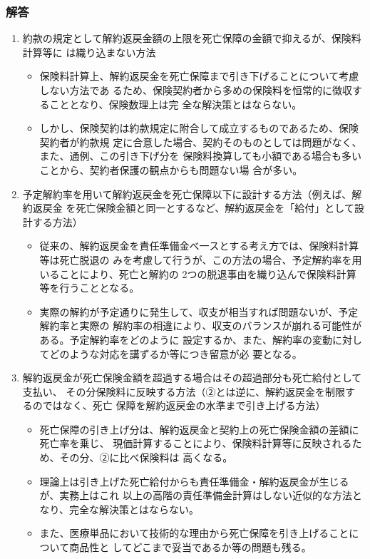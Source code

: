 \documentclass[report,gutter=10mm,fore-edge=10mm,uplatex,dvipdfmx]{jlreq}
\begin{document}
\subsubsection{解答}
\begin{enumerate}
 \item 約款の規定として解約返戻金額の上限を死亡保障の金額で抑えるが、保険料計算等に
は織り込まない方法
\begin{itemize}
 \item 保険料計算上、解約返戻金を死亡保障まで引き下げることについて考慮しない方法であ
るため、保険契約者から多めの保険料を恒常的に徴収することとなり、保険数理上は完
全な解決策とはならない。
 \item しかし、保険契約は約款規定に附合して成立するものであるため、保険契約者が約款規
定に合意した場合、契約そのものとしては問題がなく、また、通例、この引き下げ分を
保険料換算しても小額である場合も多いことから、契約者保護の観点からも問題ない場
合が多い。
\end{itemize}
 \item 予定解約率を用いて解約返戻金を死亡保障以下に設計する方法（例えば、解約返戻金
を死亡保険金額と同一とするなど、解約返戻金を「給付」として設計する方法）
\begin{itemize}
 \item 従来の、解約返戻金を責任準備金べ一スとする考え方では、保険料計算等は死亡脱退の
みを考慮して行うが、この方法の場合、予定解約率を用いることにより、死亡と解約の
2つの脱退事由を織り込んで保険料計算等を行うこととなる。
 \item 実際の解約が予定通りに発生して、収支が相当すれば問題ないが、予定解約率と実際の
解約率の相違により、収支のバランスが崩れる可能性がある。予定解約率をどのように
設定するか、また、解約率の変動に対してどのような対応を講ずるか等につき留意が必
要となる。
\end{itemize}
 \item 解約返戻金が死亡保険金額を超過する場合はその超過部分も死亡給付として支払い、
その分保険料に反映する方法（②とは逆に、解約返戻金を制限するのではなく、死亡
保障を解約返戻金の水準まで引き上げる方法）
\begin{itemize}
 \item 死亡保障の引き上げ分は、解約返戻金と契約上の死亡保険金額の差額に死亡率を乗じ、
現価計算することにより、保険料計算等に反映されるため、その分、②に比べ保険料は
高くなる。
 \item 理論上は引き上げた死亡給付からも責任準備金・解約返戻金が生じるが、実務上はこれ
以上の高階の責任準備金計算はしない近似的な方法となり、完全な解決策とはならない。
 \item また、医療単品において技術的な理由から死亡保障を引き上げることについて商品性と
してどこまで妥当であるか等の問題も残る。
\end{itemize}
\end{enumerate}
\end{document}
